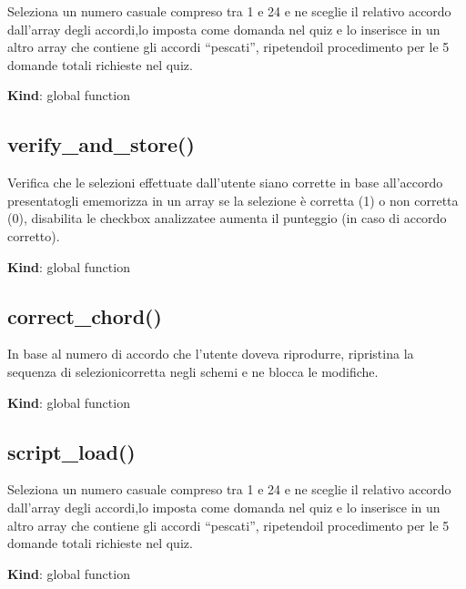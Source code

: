 Seleziona un numero casuale compreso tra 1 e 24 e ne sceglie il relativo
accordo dall'array degli accordi,lo imposta come domanda nel quiz e lo
inserisce in un altro array che contiene gli accordi ``pescati'',
ripetendoil procedimento per le 5 domande totali richieste nel quiz.

\textbf{Kind}: global function\\
\protect\hypertarget{verify_and_store}{}{}

\hypertarget{verify_and_store}{%
\subsection{verify\_and\_store()}\label{verify_and_store}}

Verifica che le selezioni effettuate dall'utente siano corrette in base
all'accordo presentatogli ememorizza in un array se la selezione è
corretta (1) o non corretta (0), disabilita le checkbox analizzatee
aumenta il punteggio (in caso di accordo corretto).

\textbf{Kind}: global function\\
\protect\hypertarget{correct_chord}{}{}

\hypertarget{correct_chord}{%
\subsection{correct\_chord()}\label{correct_chord}}

In base al numero di accordo che l'utente doveva riprodurre, ripristina
la sequenza di selezionicorretta negli schemi e ne blocca le modifiche.

\textbf{Kind}: global function\\
\protect\hypertarget{script_load}{}{}

\hypertarget{script_load-1}{%
\subsection{script\_load()}\label{script_load-1}}

Seleziona un numero casuale compreso tra 1 e 24 e ne sceglie il relativo
accordo dall'array degli accordi,lo imposta come domanda nel quiz e lo
inserisce in un altro array che contiene gli accordi ``pescati'',
ripetendoil procedimento per le 5 domande totali richieste nel quiz.

\textbf{Kind}: global function\\
\protect\hypertarget{verify_and_store}{}{}

